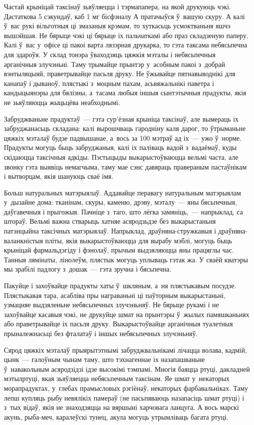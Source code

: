 Частай крыніцай таксінаў зьяўляецца і тэрмапапера, на якой друкуюць чэкі. Дастаткова 5 сэкундаў, каб 1 мг бісфэналу А пратачыўся ў~вашую скуру. А калі ў~вас рукі вільготныя ці змазаныя крэмам, то хуткасьць усмоктваньня яшчэ вышэйшая. Не бярыце чэкі ці бярыце іх пальчаткамі або праз складзеную паперу. Калі ў~вас у~офісе ці пакоі варта лязэрная друкарка, то гэта таксама небясьпечна для здароўя. У склад тонэра ўваходзяць цяжкія мэталы і небясьпечныя арганічныя злучэньні. Таму трымайце прынтэр у~асобным пакоі з~добрай вэнтыляцыяй, праветрывайце пасьля друку. Не ўжывайце пятнавыводнікі для канапаў і дываноў, плястыкі з~моцным пахам, асьвяжальнікі паветра і кандыцыянэры для бялізны, а~тасама любыя іншыя сынтэтычныя прадукты, якія не зьяўляюцца жыцьцёва неабходнымі.

Забруджваньне прадуктаў~--- гэта сур'ёзная крыніца таксінаў, але вымераць іх забруджанасьць складана: калі вырошчваць гародніну каля дарог, то ўтрыманьне цяжкіх мэталаў будзе падвышанае, а~вось за 100 мэтраў ад іх~--- ужо ў~норме. Прадукты могуць быць забруджаныя, калі іх паліваць вадой з~вадаёмаў, куды скідаюцца таксічныя адкіды. Пэстыцыды выкарыстоўваюцца вельмі часта, але звонку гэта выявіць немагчыма, таму мае сэнс давяраць правераным пастаўнікам і вытворцам, якія шануюць сваё імя.

Больш натуральных матэрыялаў. Аддавайце перавагу натуральным матэрыялам у~дызайне дома: тканінам, скуры, каменю, дрэву, мэталу~--- яны бясьпечныя, даўгавечныя і прыгожыя. Пачніце з~таго, што лёгка замяніць,~--- напрыклад, са штораў. Вельмі важна стварыць хатняе асяродзьдзе без выкарыстаньня патэнцыйна таксічных матэрыялаў. Напрыклад, драўняна-стружкавыя і драўняна-валанкністыя пліты, якія выкарыстоўваюцца для вырабу мэблі, могуць быць крыніцай фармальдэгіду і фэнолаў, прычым выдзяляюцца яны працяглы час. Танныя лямінаты, лінолеўм, плястык могуць уплываць гэтак жа. У сваёй кватэры мы зрабілі падлогу з~дошак~--- гэта зручна і бясьпечна.

Пакуйце і захоўвайце прадукты хаты ў~шкляным, а~ня плястыкавым посудзе. Плястыкавая тара, асабліва пры награваньні ці паўторным выкарыстаньні, узмацняе выдзяленьне небясьпечных злучэньняў. Не бярыце рукамі і не захоўвайце касавыя чэкі, не друкуйце шмат на прынтэры ў~жылых памяшканьнях або праветрывайце іх пасьля друку. Выкарыстоўвайце арганічныя туалетныя прыналежнасьці без фталатаў і іншых небясьпечных злучэньняў.

Сярод цяжкіх мэталаў прыярытэтнымі забруджвальнікамі лічацца волава, кадмій, цынк~--- галоўным чынам таму, што тэхнагеннае іх назапашваньне ў~навакольным асяродзідзі ідзе высокімі тэмпамі. Многія баяцца ртуці, дакладней мэтылртуці, якая зьяўляецца небясьпечным таксінам. Яе шмат у~некаторых морапрадуктах, у~глебах прамысловых рэгіёнаў, некаторых фарбавальніках. Таму лепш купляць рыбу невялікіх памераў (не пасьпяваюць назапасіць шмат ртуці) і з~тых відаў, якія не знаходзяцца на вяршыні харчовага ланцуга. А вось марскі акунь, рыба-меч, каралеўскі тунец, акула могуць утрымліваць багата ртуці.

